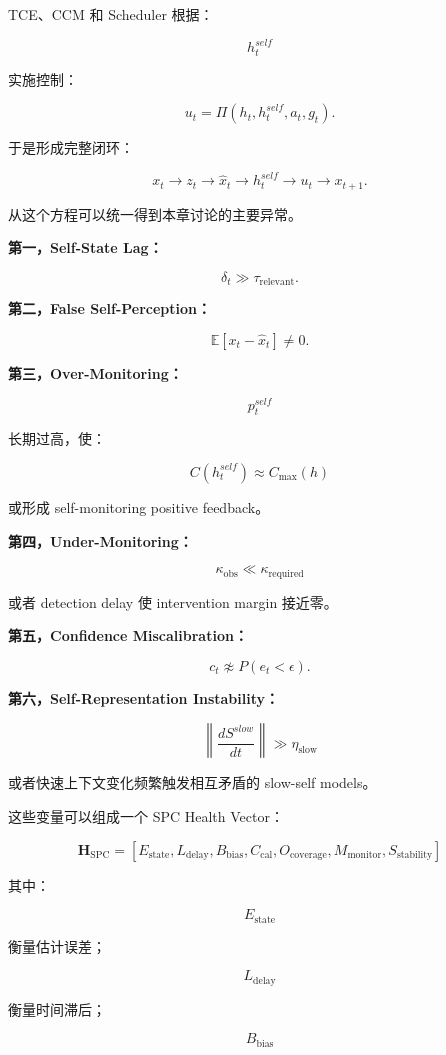 TCE、CCM 和 Scheduler 根据：

\[
h_t^{self}
\]

实施控制：

\[
u_t
=
\Pi
\left(
h_t,
h_t^{self},
a_t,
g_t
\right).
\]

于是形成完整闭环：

\[
x_t
\rightarrow
z_t
\rightarrow
\hat{x}_t
\rightarrow
h_t^{self}
\rightarrow
u_t
\rightarrow
x_{t+1}.
\]

从这个方程可以统一得到本章讨论的主要异常。

\textbf{第一，Self-State Lag：}

\[
\delta_t
\gg
\tau_{\mathrm{relevant}}.
\]

\textbf{第二，False Self-Perception：}

\[
\mathbb E[
x_t-\hat{x}_t
]
\neq0.
\]

\textbf{第三，Over-Monitoring：}

\[
p_t^{self}
\]

长期过高，使：

\[
C(h_t^{self})
\approx
C_{\max}(h)
\]

或形成 self-monitoring positive feedback。

\textbf{第四，Under-Monitoring：}

\[
\kappa_{\mathrm{obs}}
\ll
\kappa_{\mathrm{required}}
\]

或者 detection delay 使 intervention margin 接近零。

\textbf{第五，Confidence Miscalibration：}

\[
c_t
\not\approx
P(
e_t<\epsilon
).
\]

\textbf{第六，Self-Representation Instability：}

\[
\left\|
\frac{dS^{slow}}{dt}
\right\|
\gg
\eta_{\mathrm{slow}}
\]

或者快速上下文变化频繁触发相互矛盾的 slow-self models。

这些变量可以组成一个 SPC Health Vector：

\[
\boxed{
\mathbf H_{\mathrm{SPC}}
=
[
E_{\mathrm{state}},
L_{\mathrm{delay}},
B_{\mathrm{bias}},
C_{\mathrm{cal}},
O_{\mathrm{coverage}},
M_{\mathrm{monitor}},
S_{\mathrm{stability}}
]
}
\]

其中：

\[
E_{\mathrm{state}}
\]

衡量估计误差；

\[
L_{\mathrm{delay}}
\]

衡量时间滞后；

\[
B_{\mathrm{bias}}
\]


